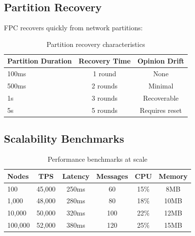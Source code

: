 \subsection{Partition Recovery}

FPC recovers quickly from network partitions:

\begin{table}[h]
\centering
\begin{tabular}{lcc}
\toprule
\textbf{Partition Duration} & \textbf{Recovery Time} & \textbf{Opinion Drift} \\
\midrule
100ms & 1 round & None \\
500ms & 2 rounds & Minimal \\
1s & 3 rounds & Recoverable \\
5s & 5 rounds & Requires reset \\
\bottomrule
\end{tabular}
\caption{Partition recovery characteristics}
\label{tab:partition}
\end{table}

\subsection{Scalability Benchmarks}

\begin{table}[h]
\centering
\begin{tabular}{lccccc}
\toprule
\textbf{Nodes} & \textbf{TPS} & \textbf{Latency} & \textbf{Messages} & \textbf{CPU} & \textbf{Memory} \\
\midrule
100 & 45,000 & 250ms & 60 & 15\% & 8MB \\
1,000 & 48,000 & 280ms & 80 & 18\% & 10MB \\
10,000 & 50,000 & 320ms & 100 & 22\% & 12MB \\
100,000 & 52,000 & 380ms & 120 & 25\% & 15MB \\
\bottomrule
\end{tabular}
\caption{Performance benchmarks at scale}
\label{tab:benchmarks}
\end{table}

